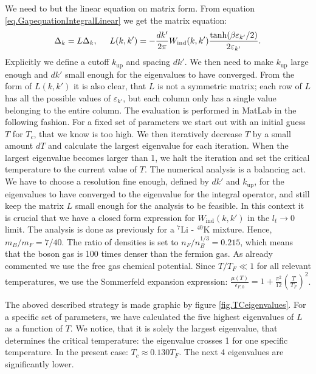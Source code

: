 We need to but the linear equation on matrix form. From equation \eqref{eq.GapequationIntegralLinear} we get the matrix equation:
\begin{equation}
\Delta_k = L \Delta_k, \hspace{0.5cm} L(k,k') = -\frac{dk'}{2\pi} W_{\text{ind}}(k,k')\frac{\tanh(\beta \varepsilon_{k'}/2)}{2\varepsilon_{k'}}. 
\label{eq.Gapmatrixequation}
\end{equation}
Explicitly we define a cutoff $k_{\text{up}}$ and spacing $dk'$. We then need to make $k_{\text{up}}$ large enough and $dk'$ small enough for the eigenvalues to have converged. From the form of $L(k,k')$ it is also clear, that $L$ is not a symmetric matrix; each row of $L$ has all the possible values of $\varepsilon_{k'}$, but each column only has a single value belonging to the entire column. The evaluation is performed in MatLab in the following fashion. For a fixed set of parameters we start out with an initial guess $T$ for $T_c$, that we know is too high. We then iteratively decrease $T$ by a small amount $dT$ and calculate the largest eigenvalue for each iteration. When the largest eigenvalue becomes larger than 1, we halt the iteration and set the critical temperature to the current value of $T$. The numerical analysis is a balancing act. We have to choose a resolution fine enough, defined by $dk'$ and $k_{\text{up}}$, for the eigenvalues to have converged to the eigenvalue for the integral operator, and still keep the matrix $L$ small enough for the analysis to be feasible. In this context it is crucial that we have a closed form expression for $W_{\text{ind}}(k,k')$ in the $l_t \to 0$ limit. The analysis is done as previously for a $^{7}\text{Li}$ - $^{40}\text{K}$ mixture. Hence, $m_B/m_F = 7/40$. The ratio of densities is set to $n_F/{n_B^{1/3}} = 0.215$, which means that the boson gas is 100 times denser than the fermion gas. As already commented we use the free gas chemical potential. Since $T/T_F \ll 1$ for all relevant temperatures, we use the Sommerfeld expansion expression: $\frac{\mu(T)}{\epsilon_{F,0}} = 1 + \frac{\pi^2}{12}\left(\frac{T}{T_F}\right)^2$. 

The aboved described strategy is made graphic by figure \ref{fig.TCeigenvalues}. For a specific set of parameters, we have calculated the five highest eigenvalues of $L$ as a function of $T$. We notice, that it is solely the largest eigenvalue, that determines the critical temperature: the eigenvalue crosses 1 for one specific temperature. In the present case: $T_c \approx 0.130 T_F$. The next 4 eigenvalues are significantly lower. 

